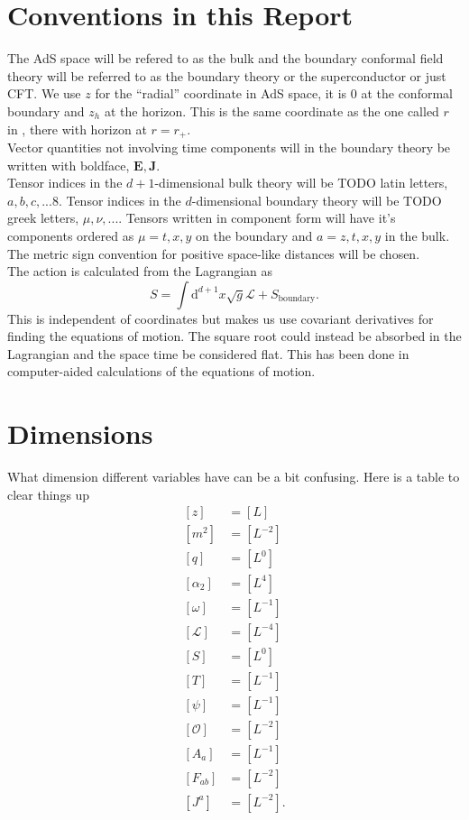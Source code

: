\documentclass[12pt]{report}
\renewcommand{\d}{\ensuremath{\mathrm{d}}}
\renewcommand{\L}{\ensuremath{\mathcal{L}}}
\begin{document}
\begin{appendices}
\chapter{Conventions in this Report\label{conventions}}
The AdS space will be refered to as the bulk and the boundary conformal field theory will be referred to as the boundary theory or the superconductor or just CFT. We use $z$ for the ``radial'' coordinate in AdS space, it is 0 at the conformal boundary and $z_h$ at the horizon. This is the same coordinate as the one called $r$ in \cite{hartnoll8}, there with horizon at $r=r_+$.\\
Vector quantities not involving time components will in the boundary theory be written with boldface, $\mathbf{E}, \mathbf{J}$.\\
Tensor indices in the $d+1$-dimensional bulk theory will be TODO latin letters, $a,b,c,...8$. Tensor indices in the $d$-dimensional boundary theory will be TODO greek letters, $\mu,\nu,...$. Tensors written in component form will have it's components ordered as $\mu=t,x,y$ on the boundary and $a=z,t,x,y$ in the bulk.
The metric sign convention for positive space-like distances will be chosen.\\
The action is calculated from the Lagrangian as
\begin{equation}
 S=\int\d^{d+1} x\sqrt{g}\L+S_\mathrm{boundary}.
\end{equation}
This is independent of coordinates but makes us use covariant derivatives for finding the equations of motion. The square root could instead be absorbed in the Lagrangian and the space time be considered flat. This has been done in computer-aided calculations of the equations of motion.
\chapter{Dimensions}
What dimension different variables have can be a bit confusing. Here is a table to clear things up
\begin{equation}
 \begin{split}
[z]&=[L]\\
[m^2]&=[L^{-2}]\\
[q]&=[L^{0}]\\
[\alpha_2]&=[L^{4}]\\
[\omega]&=[L^{-1}]\\
[\mathcal{L}]&=[L^{-4}]\\
[S]&=[L^0]\\
[T]&=[L^{-1}]\\
[\psi]&=[L^{-1}]\\
[\mathcal{O}]&=[L^{-2}]\\
[A_a]&=[L^{-1}]\\
[F_{ab}]&=[L^{-2}]\\
[J^a]&=[L^{-2}].
 \end{split}
\end{equation}



\end{appendices}
\end{document}
